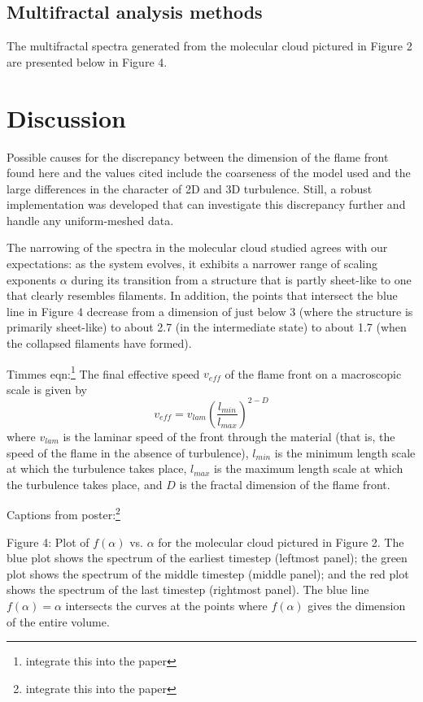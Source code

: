 \documentclass[iop]{emulateapj}
\begin{document}
\subsection{Multifractal analysis methods}\label{MultifractalResults}
The multifractal spectra generated from the molecular cloud pictured in Figure 2 are presented below in Figure 4.

\section{Discussion}\label{Discussion}
Possible causes for the discrepancy between the dimension of the flame front found here and the values cited include the coarseness of the model used and the large differences in the character of 2D and 3D turbulence. Still, a robust implementation was developed that can investigate this discrepancy further and handle any uniform-meshed data.
 
The narrowing of the spectra in the molecular cloud studied agrees with our expectations: as the system evolves, it exhibits a narrower range of scaling exponents $ \alpha $ during its transition from a structure that is partly sheet-like to one that clearly resembles filaments. In addition, the points that intersect the blue line in Figure 4 decrease from a dimension of just below 3 (where the structure is primarily sheet-like) to about 2.7 (in the intermediate state) to about 1.7 (when the collapsed filaments have formed).


Timmes eqn:\footnote{integrate this into the paper}
	The final effective speed $v_{eff}$ of the flame front on a macroscopic scale is given by
	\begin{equation} 
	v_{eff} = v_{lam} \left(\frac{l_{min}}{l_{max}}\right)^{2 - D}
	\end{equation}
	where $v_{lam}$ is the laminar speed of the front through the material (that is, the speed of the flame in the absence of turbulence), $l_{min}$ is the minimum length scale at which the turbulence takes place, $l_{max}$ is the maximum length scale at which the turbulence takes place, and $ D $ is the fractal dimension of the flame front.

Captions from poster:\footnote{integrate this into the paper}

	Figure 4: Plot of $f(\alpha)$ vs. $\alpha$ for the molecular cloud pictured in Figure 2. The blue plot shows the spectrum of the earliest timestep (leftmost panel); the green plot shows the spectrum of the middle timestep (middle panel); and the red plot shows the spectrum of the last timestep (rightmost panel). The blue line $f(\alpha) = \alpha $ intersects the curves at the points where $f(\alpha)$ gives the dimension of the entire volume.
\end{document}

